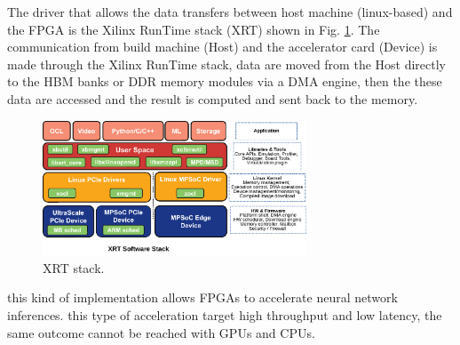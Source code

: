 \documentclass[../../main.tex]{subfiles}
\begin{document}
The driver that allows the data transfers between host machine (linux-based) and the FPGA is the Xilinx RunTime stack (XRT) shown in Fig. \ref{fig:Alveo_XRT}. The communication from build machine (Host) and the accelerator card (Device) is made through the Xilinx RunTime stack, data are moved from the Host directly to the HBM banks or DDR memory modules via a DMA engine, then the these data are accessed and the result is computed and sent back to the memory.
    
\begin{figure}[h]
    \centering
    \includegraphics[width=0.7\textwidth]{sections/04/Images/XRT-Layers.pdf}
    \caption{XRT stack.}
    \label{fig:Alveo_XRT}
\end{figure}  

this kind of implementation allows FPGAs to accelerate neural network inferences. this type of acceleration target high throughput and low latency, the same outcome cannot be reached with GPUs and CPUs\cite{ALVEO-NN}.
\end{document}
